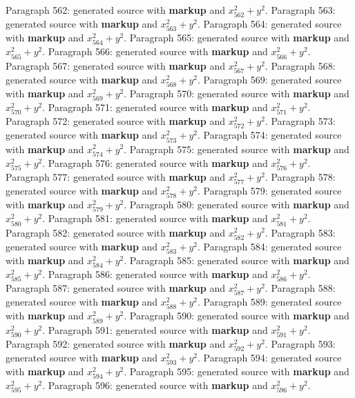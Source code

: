 \documentclass{article}
\begin{document}
Paragraph 562: generated source with \textbf{markup} and $x_{562}^2 + y^2$.
Paragraph 563: generated source with \textbf{markup} and $x_{563}^2 + y^2$.
Paragraph 564: generated source with \textbf{markup} and $x_{564}^2 + y^2$.
Paragraph 565: generated source with \textbf{markup} and $x_{565}^2 + y^2$.
Paragraph 566: generated source with \textbf{markup} and $x_{566}^2 + y^2$.
Paragraph 567: generated source with \textbf{markup} and $x_{567}^2 + y^2$.
Paragraph 568: generated source with \textbf{markup} and $x_{568}^2 + y^2$.
Paragraph 569: generated source with \textbf{markup} and $x_{569}^2 + y^2$.
Paragraph 570: generated source with \textbf{markup} and $x_{570}^2 + y^2$.
Paragraph 571: generated source with \textbf{markup} and $x_{571}^2 + y^2$.
Paragraph 572: generated source with \textbf{markup} and $x_{572}^2 + y^2$.
Paragraph 573: generated source with \textbf{markup} and $x_{573}^2 + y^2$.
Paragraph 574: generated source with \textbf{markup} and $x_{574}^2 + y^2$.
Paragraph 575: generated source with \textbf{markup} and $x_{575}^2 + y^2$.
Paragraph 576: generated source with \textbf{markup} and $x_{576}^2 + y^2$.
Paragraph 577: generated source with \textbf{markup} and $x_{577}^2 + y^2$.
Paragraph 578: generated source with \textbf{markup} and $x_{578}^2 + y^2$.
Paragraph 579: generated source with \textbf{markup} and $x_{579}^2 + y^2$.
Paragraph 580: generated source with \textbf{markup} and $x_{580}^2 + y^2$.
Paragraph 581: generated source with \textbf{markup} and $x_{581}^2 + y^2$.
Paragraph 582: generated source with \textbf{markup} and $x_{582}^2 + y^2$.
Paragraph 583: generated source with \textbf{markup} and $x_{583}^2 + y^2$.
Paragraph 584: generated source with \textbf{markup} and $x_{584}^2 + y^2$.
Paragraph 585: generated source with \textbf{markup} and $x_{585}^2 + y^2$.
Paragraph 586: generated source with \textbf{markup} and $x_{586}^2 + y^2$.
Paragraph 587: generated source with \textbf{markup} and $x_{587}^2 + y^2$.
Paragraph 588: generated source with \textbf{markup} and $x_{588}^2 + y^2$.
Paragraph 589: generated source with \textbf{markup} and $x_{589}^2 + y^2$.
Paragraph 590: generated source with \textbf{markup} and $x_{590}^2 + y^2$.
Paragraph 591: generated source with \textbf{markup} and $x_{591}^2 + y^2$.
Paragraph 592: generated source with \textbf{markup} and $x_{592}^2 + y^2$.
Paragraph 593: generated source with \textbf{markup} and $x_{593}^2 + y^2$.
Paragraph 594: generated source with \textbf{markup} and $x_{594}^2 + y^2$.
Paragraph 595: generated source with \textbf{markup} and $x_{595}^2 + y^2$.
Paragraph 596: generated source with \textbf{markup} and $x_{596}^2 + y^2$.
\end{document}
